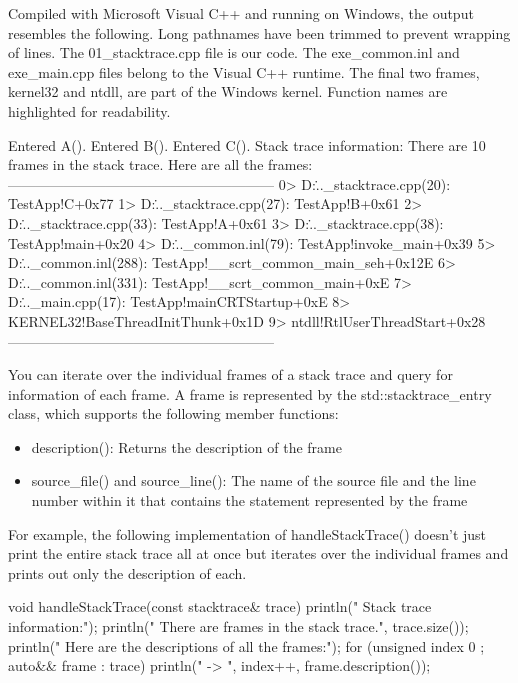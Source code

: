 Compiled with Microsoft Visual C++ and running on Windows, the output resembles the following. Long pathnames have been trimmed to prevent wrapping of lines. The 01\_stacktrace.cpp file is our code. The exe\_common.inl and exe\_main.cpp files belong to the Visual C++ runtime. The final two frames, kernel32 and ntdll, are part of the Windows kernel. Function names are highlighted for readability.

\begin{shell}
Entered A().
Entered B().
Entered C().
  Stack trace information:
    There are 10 frames in the stack trace.
    Here are all the frames:
---------------------------------------------------------
0> D:\..._stacktrace.cpp(20): TestApp!C+0x77
1> D:\..._stacktrace.cpp(27): TestApp!B+0x61
2> D:\..._stacktrace.cpp(33): TestApp!A+0x61
3> D:\..._stacktrace.cpp(38): TestApp!main+0x20
4> D:\...\exe_common.inl(79): TestApp!invoke_main+0x39
5> D:\...\exe_common.inl(288): TestApp!__scrt_common_main_seh+0x12E
6> D:\...\exe_common.inl(331): TestApp!__scrt_common_main+0xE
7> D:\...\exe_main.cpp(17): TestApp!mainCRTStartup+0xE
8> KERNEL32!BaseThreadInitThunk+0x1D
9> ntdll!RtlUserThreadStart+0x28
---------------------------------------------------------
\end{shell}

You can iterate over the individual frames of a stack trace and query for information of each frame. A frame is represented by the std::stacktrace\_entry class, which supports the following member functions:

\begin{itemize}
\item
description(): Returns the description of the frame

\item
source\_file() and source\_line(): The name of the source file and the line number within it that contains the statement represented by the frame
\end{itemize}

For example, the following implementation of handleStackTrace() doesn’t just print the entire stack trace all at once but iterates over the individual frames and prints out only the description of each.

\begin{cpp}
void handleStackTrace(const stacktrace& trace)
{
    println(" Stack trace information:");
    println(" There are {} frames in the stack trace.", trace.size());
    println(" Here are the descriptions of all the frames:");
    for (unsigned index { 0 }; auto&& frame : trace) {
        println(" {} -> {}", index++, frame.description());
    }
}
\end{cpp}

